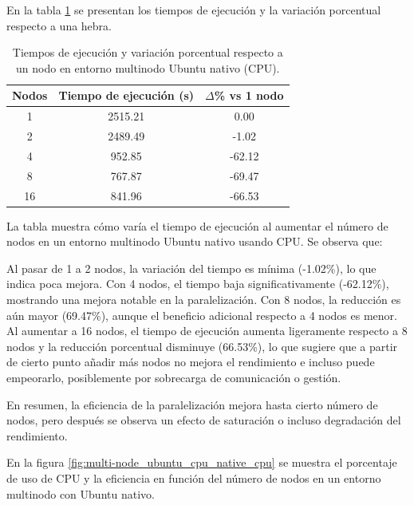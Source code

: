 En la tabla \ref{tab:multi-node_ubuntu_cpu_native} se presentan los tiempos de ejecución y la variación porcentual respecto a una hebra.

\begin{table}[ht]
    \centering
    \begin{tabular}{|c|c|c|}
        \hline
        \textbf{Nodos} & \textbf{Tiempo de ejecución (s)} & \textbf{$\Delta$\% vs 1 nodo} \\
        \hline
        1              & 2515.21                          & 0.00                          \\
        2              & 2489.49                          & -1.02                         \\
        4              & 952.85                           & -62.12                        \\
        8              & 767.87                           & -69.47                        \\
        16             & 841.96                           & -66.53                        \\
        \hline
    \end{tabular}
    \caption{Tiempos de ejecución y variación porcentual respecto a un nodo en entorno multinodo Ubuntu nativo (CPU).}
    \label{tab:multi-node_ubuntu_cpu_native}
\end{table}

La tabla muestra cómo varía el tiempo de ejecución al aumentar el número de nodos en un entorno multinodo Ubuntu nativo usando CPU. Se observa que:

Al pasar de 1 a 2 nodos, la variación del tiempo es mínima (-1.02\%), lo que indica poca mejora.
Con 4 nodos, el tiempo baja significativamente (-62.12\%), mostrando una mejora notable en la paralelización.
Con 8 nodos, la reducción es aún mayor (69.47\%), aunque el beneficio adicional respecto a 4 nodos es menor.
Al aumentar a 16 nodos, el tiempo de ejecución aumenta ligeramente respecto a 8 nodos y la reducción porcentual disminuye (66.53\%), lo que sugiere que a partir de cierto punto añadir más nodos no mejora el rendimiento e incluso puede empeorarlo, posiblemente por sobrecarga de comunicación o gestión.

En resumen, la eficiencia de la paralelización mejora hasta cierto número de nodos, pero después se observa un efecto de saturación o incluso degradación del rendimiento.

En la figura \ref{fig:multi-node_ubuntu_cpu_native_cpu} se muestra el porcentaje de uso de CPU y la eficiencia en función del número de nodos en un entorno multinodo con Ubuntu nativo.

